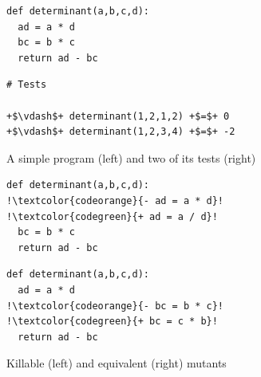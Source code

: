 \documentclass[sigconf,review,anonymous]{acmart}
\begin{document}
\begin{figure}[t]
\begin{minipage}{.45\columnwidth}  %
\begin{lstlisting}[style=python]
def determinant(a,b,c,d):
  ad = a * d
  bc = b * c
  return ad - bc
\end{lstlisting}
\end{minipage}
\hfill
\begin{minipage}{0.5\columnwidth} %
\begin{lstlisting}[style=python,escapechar=+, numbers=none]
# Tests

+$\vdash$+ determinant(1,2,1,2) +$=$+ 0
+$\vdash$+ determinant(1,2,3,4) +$=$+ -2
\end{lstlisting}
\end{minipage}
\caption{A simple program (left) and two of its tests (right)}
\label{fig:working-example}
%
\end{figure}
%
\begin{figure}[t]
\begin{minipage}{.45\columnwidth}  %
\begin{lstlisting}[style=python,escapechar=!]
def determinant(a,b,c,d):
!\textcolor{codeorange}{- ad = a * d}!
!\textcolor{codegreen}{+ ad = a / d}!
  bc = b * c
  return ad - bc
\end{lstlisting}
\end{minipage}
\hfill
\begin{minipage}{0.5\columnwidth} %
\begin{lstlisting}[style=python,escapechar=!, numbers=none]
def determinant(a,b,c,d):
  ad = a * d
!\textcolor{codeorange}{- bc = b * c}!
!\textcolor{codegreen}{+ bc = c * b}!
  return ad - bc
\end{lstlisting}
\end{minipage}
\vspace*{-4mm}
\caption{Killable (left) and equivalent (right) mutants}
\label{fig:working-example-mutants}
\end{figure}
\end{document}

